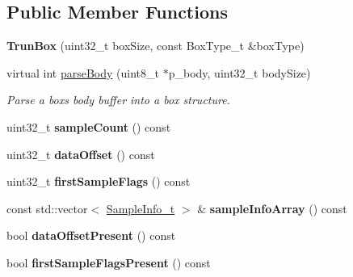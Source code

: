 \subsection*{Public Member Functions}
\begin{DoxyCompactItemize}
\item 
\mbox{\label{classmp4_parser_1_1_trun_box_adfc58d1d01862b89a6180100799c90b9}} 
{\bfseries Trun\+Box} (uint32\+\_\+t box\+Size, const Box\+Type\+\_\+t \&box\+Type)
\item 
virtual int \mbox{\hyperlink{classmp4_parser_1_1_trun_box_ac17bd64107ffbada335874e12d8a8a25}{parse\+Body}} (uint8\+\_\+t $\ast$p\+\_\+body, uint32\+\_\+t body\+Size)
\begin{DoxyCompactList}\small\item\em Parse a box\textquotesingle{}s body buffer into a box structure. \end{DoxyCompactList}\item 
\mbox{\label{classmp4_parser_1_1_trun_box_a28c8e086ea06c071022d147ab2efe9b8}} 
uint32\+\_\+t {\bfseries sample\+Count} () const
\item 
\mbox{\label{classmp4_parser_1_1_trun_box_a4323b6265307a326db79288ebff7d422}} 
uint32\+\_\+t {\bfseries data\+Offset} () const
\item 
\mbox{\label{classmp4_parser_1_1_trun_box_a4f72976c60fa4ecc7f6e7f53e7219f05}} 
uint32\+\_\+t {\bfseries first\+Sample\+Flags} () const
\item 
\mbox{\label{classmp4_parser_1_1_trun_box_adc79ed2080b90ebb80cad02a0c477056}} 
const std\+::vector$<$ \mbox{\hyperlink{structmp4_parser_1_1_trun_box_1_1_sample_info__t}{Sample\+Info\+\_\+t}} $>$ \& {\bfseries sample\+Info\+Array} () const
\item 
\mbox{\label{classmp4_parser_1_1_trun_box_a57ee728814056de91633c3cd00df5559}} 
bool {\bfseries data\+Offset\+Present} () const
\item 
\mbox{\label{classmp4_parser_1_1_trun_box_a29c289631bd9f128c24d9c0467474fdf}} 
bool {\bfseries first\+Sample\+Flags\+Present} () const

\end{DoxyCompactItemize}
